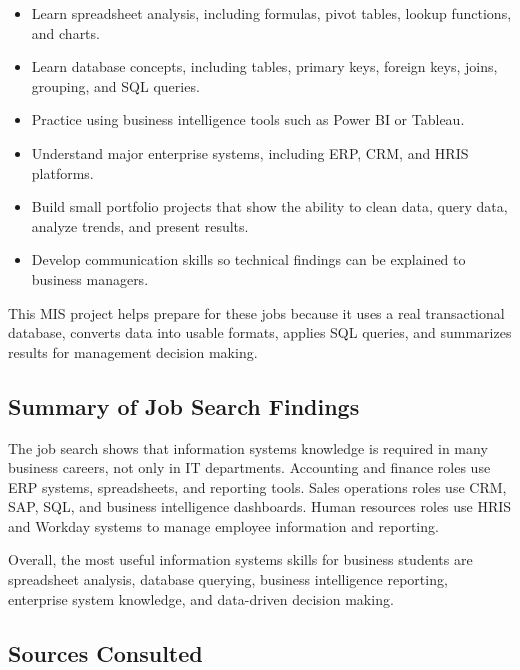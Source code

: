 \documentclass[12pt]{article}
\begin{document}
\begin{itemize}
    \item Learn spreadsheet analysis, including formulas, pivot tables, lookup
    functions, and charts.
    
    \item Learn database concepts, including tables, primary keys, foreign keys,
    joins, grouping, and SQL queries.
    
    \item Practice using business intelligence tools such as Power BI or Tableau.
    
    \item Understand major enterprise systems, including ERP, CRM, and HRIS
    platforms.
    
    \item Build small portfolio projects that show the ability to clean data,
    query data, analyze trends, and present results.
    
    \item Develop communication skills so technical findings can be explained to
    business managers.
\end{itemize}

This MIS project helps prepare for these jobs because it uses a real transactional
database, converts data into usable formats, applies SQL queries, and summarizes
results for management decision making.


\subsection{Summary of Job Search Findings}

The job search shows that information systems knowledge is required in many
business careers, not only in IT departments. Accounting and finance roles use
ERP systems, spreadsheets, and reporting tools. Sales operations roles use CRM,
SAP, SQL, and business intelligence dashboards. Human resources roles use HRIS
and Workday systems to manage employee information and reporting.

Overall, the most useful information systems skills for business students are
spreadsheet analysis, database querying, business intelligence reporting,
enterprise system knowledge, and data-driven decision making.


\subsection{Sources Consulted}
\end{document}
